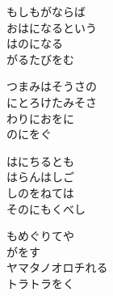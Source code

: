 \documentclass[10pt,b5j]{tarticle} %
\begin{document}
\vspace{0.5em} %
\newcommand{\linespace}{0.3em} %
\newcommand{\blocksize}{0.33\hsize} %
\begin{enumerate} %
    \begin{minipage}[c]{\blocksize}
    
        \vspace{\linespace}
        \item
        もしもがならば\\
        おはになるという\\
        はのになる\\
        がるたびをむ
        
        \vspace{\linespace}
        \item
        つまみはそうさの\\
        にとろけたみそさ\\
        わりにおをに\\
        のにをぐ
        
        \vspace{\linespace}
        \item
        はにちるとも\\
        はらんはしご\\
        しのをねては\\
        そのにもくべし
        
        \vspace{\linespace}
        \item
        もめぐりてや\\
        がをす\\
        ヤマタノオロチれる\\
        トラトラをく
        

\end{minipage}
\end{enumerate}
\end{document}
